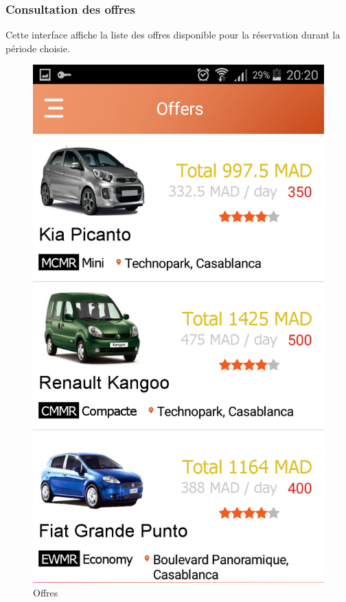 \documentclass[12pt,a4paper]{report}
\begin{document}
	\subsubsection{Consultation des offres}
Cette interface affiche la liste des offres disponible pour la réservation durant la période choisie.
	\vspace{2cm}
	\begin{figure}[!hbtp]
		\centering
		\includegraphics[scale=0.2]{./graphics/Offres.png}
		\caption{Offres}
		\end{figure}
		\newpage		
	
\end{document}
